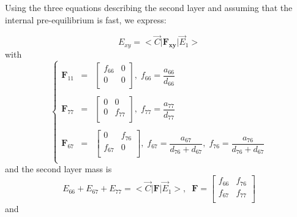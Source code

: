 \documentclass[aps,onecolumn,11pt]{revtex4}
\newcommand{\mymat}[1]{{\bm{#1}}}
\begin{document}
Using the three equations describing the second layer and assuming that the internal pre-equilibrium is fast, we express:

\begin{equation}
\boxed{
E_{xy} = <{\vec{C}} \vert \mymat{F_{xy}} \vert \vec{E}_1 >
}
\end{equation}
with
\begin{equation}
\left\lbrace
\begin{array}{rcl}
\mymat{F}_{11} & = & 
\begin{bmatrix}
	f_{66} & 0 \\
	0 & 0\\
\end{bmatrix}, \; f_{66} = \dfrac{a_{66}}{d_{66}}\\
\\
\mymat{F}_{77} & = & 
\begin{bmatrix}
	0 & 0 \\
	0 & f_{77}\\
\end{bmatrix}, \; f_{77} = \dfrac{a_{77}}{d_{77}}\\
\\
\mymat{F}_{67} & = & 
\begin{bmatrix}
	0 & f_{76}\\
	f_{67} & 0\\
\end{bmatrix}, \; f_{67} = \dfrac{a_{67}}{d_{76}+d_{67}},\; f_{76} = \dfrac{a_{76}}{d_{76}+d_{67}}\\
\end{array}
\right.
\end{equation}
and the second layer mass is
\begin{equation}
E_{66} + E_{67} + E_{77} = <{\vec{C}} \vert \mymat{F} \vert \vec{E}_1 >, \;\;
 \mymat{F} 
 = \begin{bmatrix}
	f_{66} & f_{76}\\
	f_{67} & f_{77}\\
\end{bmatrix}
\end{equation}
and
\end{document}
